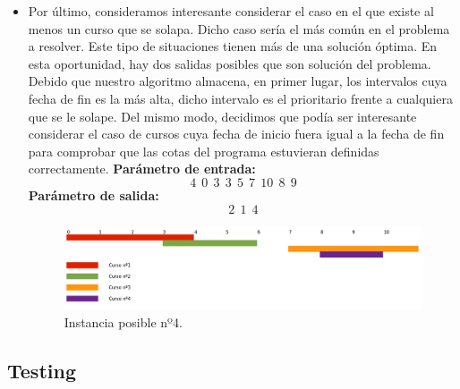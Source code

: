 \begin{itemize}
\item Por último, consideramos interesante considerar el caso en el que existe al menos un curso que se solapa. Dicho caso sería el más común en el problema a resolver. Este tipo de situaciones tienen más de una solución óptima. En esta oportunidad, hay dos salidas posibles que son solución del problema. Debido que nuestro algoritmo almacena, en primer lugar, los intervalos cuya fecha de fin es la más alta, dicho intervalo es el prioritario frente a cualquiera que se le solape. Del mismo modo, decidimos que podía ser interesante considerar el caso de cursos cuya fecha de inicio fuera igual a la fecha de fin para comprobar que las cotas del programa estuvieran definidas correctamente.\newline
\textbf{Parámetro de entrada:}  $$4\ \ 0\ \ 3\ \ 3\ \ 5\ \ 7\ \ 10\ \ 8\ \ 9$$
\textbf{Parámetro de salida:}  $$2\ \ 1\ \ 4$$ \newline

\begin{figure}[H] %
\begin{center}
\includegraphics[width=450pt]{../imgs/instancia1.jpg}
\end{center}
\caption{Instancia posible nº4.}
\end{figure}

\end{itemize}

\subsection{Testing}
